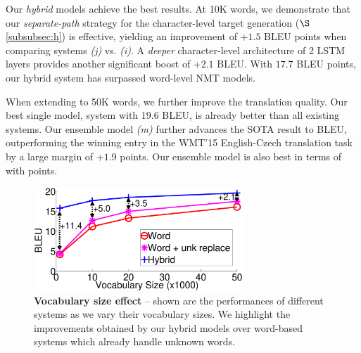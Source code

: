 

Our {\it hybrid} models achieve the best results. 
At 10K words, we demonstrate that our {\it
separate-path} strategy for the character-level target generation
($\S$\ref{subsubsec:h}) is effective, yielding an improvement of +$1.5$ BLEU
points when comparing systems {\it (j)} vs. {\it (i)}. A {\it deeper} character-level architecture of 2 LSTM
layers provides another significant
boost of +$2.1$ BLEU. %
With $17.7$ BLEU points, our hybrid system \modelsmall{} has
surpassed word-level NMT models.

When extending to 50K words, we further improve the translation quality.
Our best single model, system \model{} with $19.6$ BLEU, is already better than all
existing systems.
Our ensemble model {\it (m)} further advances the SOTA
result to \biformat{\ensbleu} BLEU, outperforming
the winning entry in the WMT'15 English-Czech translation task by a large margin
of +$1.9$ points. Our ensemble model is also best in terms of \chr{} with  points.

\begin{figure}%
\centering
\includegraphics[width=0.7\textwidth, clip=true, trim= 0 0 0 0]{img/5-vocab}
\caption[Vocabulary size effect]{{\bf Vocabulary size effect} -- shown are the performances of different
systems as we vary their vocabulary sizes. We highlight the improvements obtained
by our hybrid models over word-based systems which already handle unknown words.}
\label{f:vocab}
\end{figure}


